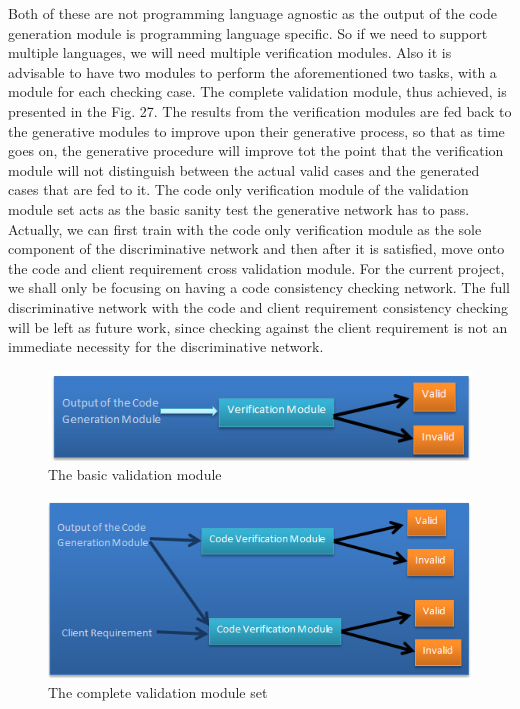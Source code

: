 \documentclass[conference, onecolumn, a4, 12pt]{IEEEtran}
\begin{document}
Both of these are not programming language agnostic as the output of the code generation module is programming language specific. So if we need to support multiple languages, we will need multiple verification modules. Also it is advisable to have two modules to perform the aforementioned two tasks, with a module for each checking case. The complete validation module, thus achieved, is presented in the Fig. 27.\newline
The results from the verification modules are fed back to the generative modules to improve upon their generative process, so that as time goes on, the generative procedure will improve tot the point that the verification module will not distinguish between the actual valid cases and the generated cases that are fed to it.\newline
The code only verification module of the validation module set acts as the basic sanity test the generative network has to pass. Actually, we can first train with the code only verification module as the sole component of the discriminative network and then after it is satisfied, move onto the code and client requirement cross validation module. For the current project, we shall only be focusing on having a code consistency checking network. The full discriminative network with the code and client requirement consistency checking will be left as future work, since checking against the client requirement is not an immediate necessity for the discriminative network.

\begin{figure}
	\includegraphics[width=\linewidth]{Validation_module.png}
	\caption{The basic validation module}
	\label{fig9}
\end{figure} 

\begin{figure}
	\includegraphics[width=\linewidth]{Complete_verification_module.png}
	\caption{The complete validation module set}
	\label{fig10}
\end{figure}
\end{document}
